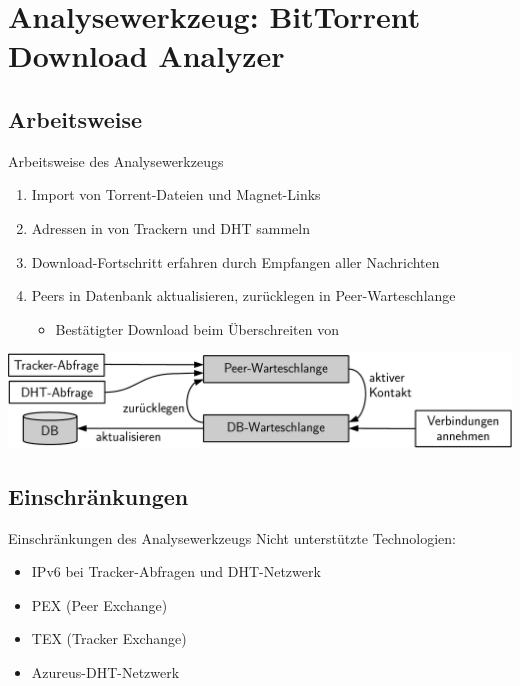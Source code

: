 \documentclass[dvipsnames]{beamer} %
\begin{document}
	\section[BitTorrent Download Analyzer]{Analysewerkzeug: \glqq BitTorrent Download Analyzer\grqq }
	\subsection{Arbeitsweise}
	\begin{frame}{Arbeitsweise des Analysewerkzeugs}
		\begin{enumerate}
			\item \alert{Import} von Torrent-Dateien und Magnet-Links
			\item \alert{Adressen} in von Trackern und DHT sammeln
			\item \alert{Download-Fortschritt} erfahren durch Empfangen aller Nachrichten
			\item Peers in \alert{Datenbank} aktualisieren, zurücklegen in Peer-Warteschlange
			\begin{itemize}
				\item Bestätigter Download beim Überschreiten von 
			\end{itemize}
		\end{enumerate}

		\vspace{0.7cm}
    \includegraphics[width=\textwidth]{components-crop}
	\end{frame}

	\subsection{Einschränkungen}
	\begin{frame}{Einschränkungen des Analysewerkzeugs}
		Nicht unterstützte Technologien:

		\begin{itemize}
			\item IPv6 bei Tracker-Abfragen und DHT-Netzwerk
			\item PEX (Peer Exchange)
			\item TEX (Tracker Exchange)
			\item Azureus-DHT-Netzwerk
		\end{itemize}
	\end{frame}
\end{document}
